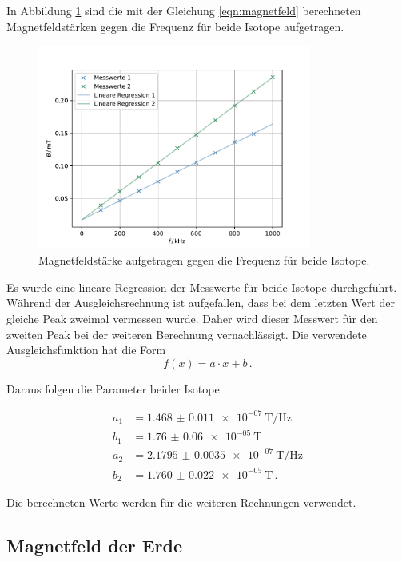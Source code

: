 In Abbildung \ref{fig:plot1} sind die mit der Gleichung \ref{eqn:magnetfeld} berechneten Magnetfeldstärken gegen die Frequenz für beide Isotope aufgetragen.

\begin{figure}
    \centering
    \includegraphics[width=0.8\textwidth]{build/plot.pdf}
    \caption{Magnetfeldstärke aufgetragen gegen die Frequenz für beide Isotope.}
    \label{fig:plot1}
\end{figure}

Es wurde eine lineare Regression der Messwerte für beide Isotope durchgeführt.
Während der Ausgleichsrechnung ist aufgefallen, dass bei dem letzten Wert der gleiche Peak zweimal vermessen wurde.
Daher wird dieser Messwert für den zweiten Peak bei der weiteren Berechnung vernachlässigt.
Die verwendete Ausgleichsfunktion hat die Form
\begin{equation}
    f(x) = a \cdot x + b \, .
\end{equation}

Daraus folgen die Parameter beider Isotope

\begin{align*}
    a_1 &= \qty{1.468(11)e-07}{\tesla\per\hertz} \\
    b_1 &= \qty{1.76(6)e-05}{\tesla} \\
    a_2 &= \qty{2.1795(35)e-07}{\tesla\per\hertz} \\
    b_2 &= \qty{1.760(22)e-05}{\tesla} \, .
\end{align*}

Die berechneten Werte werden für die weiteren Rechnungen verwendet.

\subsection{Magnetfeld der Erde}
\label{sec:magnetfeld-der-erde}

